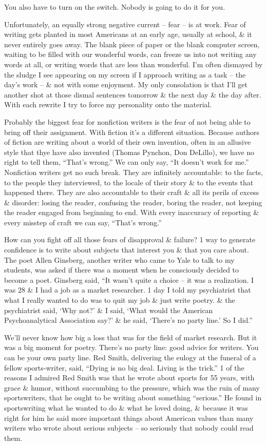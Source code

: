 \documentclass{article}
\numberwithin{equation}{section}
\begin{document}
You also have to turn on the switch. Nobody is going to do it for you.

Unfortunately, an equally strong negative current -- fear -- is at work. Fear of writing gets planted in most Americans at an early age, usually at school, \& it never entirely goes away. The blank piece of paper or the blank computer screen, waiting to be filled with our wonderful words, can freeze us into not writing any words at all, or writing words that are less than wonderful. I'm often dismayed by the sludge I see appearing on my screen if I approach writing as a task -- the day's work -- \& not with some enjoyment. My only consolation is that I'll get another shot at those dismal sentences tomorrow \& the next day \& the day after. With each rewrite I try to force my personality onto the material.

Probably the biggest fear for nonfiction writers is the fear of not being able to bring off their assignment. With fiction it's a different situation. Because authors of fiction are writing about a world of their own invention, often in an allusive style that thye have also invented (Thomas Pynchon, Don DeLillo), we have no right to tell them, ``That's wrong.'' We can only say, ``It doesn't work for me.'' Nonfiction writers get no such break. They are infinitely accountable: to the facts, to the people they interviewed, to the locale of their story \& to the events that happened there. They are also accountable to their craft \& all  its perils of excess \& disorder: losing the reader, confusing the reader, boring the reader, not keeping the reader engaged from beginning to end. With every inaccuracy of reporting \& every misstep of craft we can say, ``That's wrong.''

How can you fight off all those fears of disapproval \& failure? 1 way to generate confidence is to write about subjects that interest you \& that you care about. The poet Allen Ginsberg, another writer who came to Yale to talk to my students, was asked if there was a moment when he consciously decided to become a poet. Ginsberg said, ``It wasn't quite a choice -- it was a realization. I was 28 \& I had a job as a market researcher. 1 day I told my psychiatrist that what I really wanted to do was to quit my job \& just write poetry. \& the psychiatrist said, `Why not?' \& I said, `What would the American Psychoanalytical Association say?' \& he said, `There's no party line.' So I did.''

We'll never know how big a loss that was for the field of market research. But it was a big moment for poetry. There's no party line: good advice for writers. You can be your own party line. Red Smith, delivering the eulogy at the funeral of a fellow sports-writer, said, ``Dying is no big deal. Living is the trick.'' 1 of the reasons I admired Red Smith was that he wrote about sports for 55 years, with grace \& humor, without succumbing to the pressure, which was the ruin of many sportswriters, that he ought to be writing about something ``serious.'' He found in sportswriting what he wanted to do \& what he loved doing, \& because it was right for him he said more important things about American values than many writers  who wrote about serious subjects -- so seriously that nobody could read them.
\end{document}
